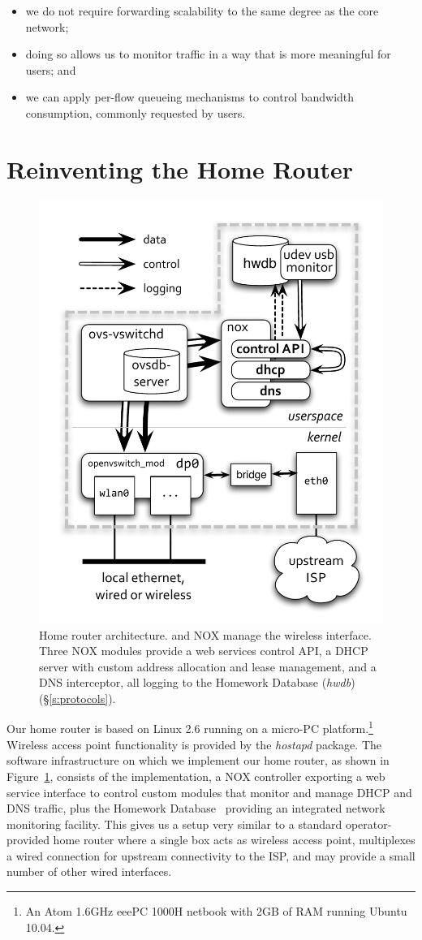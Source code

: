\begin{itemize}
    \item we do not require forwarding scalability to the same degree as the
          core network; 
    \item doing so allows us to monitor traffic in a way that is more meaningful
          for users; and 
    \item we can apply per-flow queueing mechanisms to control bandwidth
          consumption, commonly requested by users.  
  \end{itemize}

\section{Reinventing the Home Router} \label{s:router}
 
\begin{figure} 
  \centering 
  \includegraphics[trim=0.5cm 1cm 0.5cm 2.5cm, width=0.5\columnwidth]{architecture}
  \caption[Home router architecture]{\label{f:architecture}Home router architecture.  \ovs
    and NOX manage the wireless interface.  Three NOX modules
    provide a web services control API, a DHCP server with custom address
    allocation and lease management, and a DNS interceptor, all logging to the
    Homework Database (\emph{hwdb}) (\S\ref{s:protocols}). 
}\end{figure}

Our home router is based on Linux 2.6 running on a micro-PC
platform.\footnote{An Atom 1.6GHz eeePC 1000H netbook with 2GB of RAM running
  Ubuntu 10.04.} Wireless access point functionality is provided by the
\emph{hostapd} package.  The software infrastructure on which we implement our
home router, as shown in Figure~\ref{f:architecture}, consists of the \ovs \of
implementation, a NOX controller exporting a web service interface to control
custom modules that monitor and manage DHCP and DNS traffic, plus the Homework
Database~ providing
an integrated network monitoring facility.  This gives us a setup very similar
to a standard operator-provided home router where a single box acts as wireless
access point, multiplexes a wired connection for upstream connectivity to the
ISP, and may provide a small number of other wired interfaces. 
                                                                    
